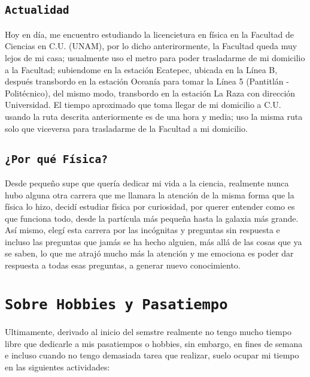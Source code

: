 \documentclass[12pt, letterpaper]{article}
\begin{document}
    \subsection{\tt{\large{Actualidad}}}
    
    \small{
    Hoy en día, me encuentro estudiando la licencietura en física en la Facultad de Ciencias en C.U. (UNAM), por lo dicho anterirormente, la Facultad queda muy lejos de mi casa; usualmente uso el metro para poder trasladarme de mi domicilio a la Facultad; subiendome en la estación Ecatepec, ubicada en la Línea B, después transbordo en la estación Oceanía para tomar la Línea 5 (Pantitlán - Politécnico), del mismo modo, transbordo en la estación La Raza con dirección Universidad. El tiempo aproximado que toma llegar de mi domicilio a C.U. usando la ruta descrita anteriormente es de una hora y media; uso la misma ruta solo que viceversa para trasladarme de la Facultad a mi domicilio.
    }
    
    
    \subsection{\tt{\large{¿Por qué Física?}}}
    
    \small{
    Desde pequeño supe que quería dedicar mi vida a la ciencia, realmente nunca hubo alguna otra carrera que me llamara la atención de la misma forma que la física lo hizo, decidí estudiar física por curiosidad, por querer entender como es que funciona todo, desde la partícula más pequeña hasta la galaxia más grande.\\
    
    Así mismo, elegí esta carrera por las incógnitas y preguntas sin respuesta e incluso las preguntas que jamás se ha hecho alguien, más allá de las cosas que ya se saben, lo que me atrajó mucho más la atención y me emociona es poder dar respuesta a todas esas preguntas, a generar nuevo conocimiento.\\
    }
    
    

\section{\tt{\LARGE{Sobre Hobbies y Pasatiempo}}}

\normalsize{
Ultimamente, derivado al inicio del semstre realmente no tengo mucho tiempo libre que dedicarle a mis pasatiempos o hobbies, sin embargo, en fines de semana e incluso cuando no tengo demasiada tarea que realizar, suelo ocupar mi tiempo en las siguientes actividades:
}
\end{document}
